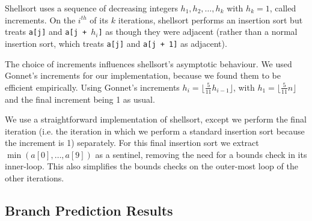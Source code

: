 \documentclass[acmtocl]{acmtrans2m}
\begin{document}
Shellsort uses a sequence of decreasing integers $h_1, h_2, \ldots, h_k$
with $h_k = 1$, called increments. 
On the $i^{th}$ of its $k$ iterations, shellsort performs
an insertion sort but treats \texttt{a[j]} and \texttt{a[j + $h_i$]} as though
they were adjacent (rather than a normal insertion sort, which treats \texttt{a[j]} 
and \texttt{a[j + 1]} as adjacent). 

The choice of increments influences shellsort's asymptotic behaviour.
We used Gonnet's increments \cite{Gonnet+91} for our implementation, because
we found them to be efficient empirically. Using
Gonnet's increments $h_i = \lfloor \frac{5}{11} h_{i - 1} \rfloor$, with $h_1 = \lfloor \frac{5}{11}n \rfloor$ and the
final increment being 1 as usual.

We use a straightforward implementation of shellsort, except we perform the final iteration
(i.e. the iteration in which we perform a standard insertion sort because the increment is 1) separately. 
For this final insertion sort
we extract $\min(a[0], \ldots, a[9])$ as a sentinel, removing the need
for a bounds check in its inner-loop. This also simplifies
the bounds checks on the outer-most loop of the other iterations.

\subsection{Branch Prediction Results}
\end{document}
